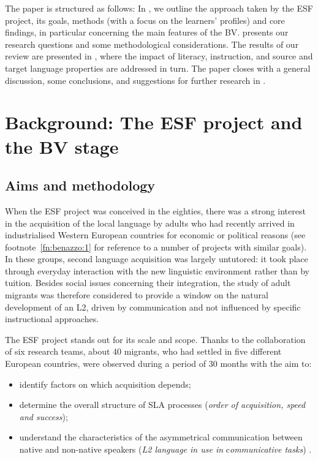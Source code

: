 \documentclass[output=paper]{langscibook}
\begin{document}
The paper is structured as follows: In , we outline the approach taken by the ESF project, its goals, methods (with a focus on the learners’ profiles) and core findings, in particular concerning the main features of the BV.  presents our research questions and some methodological considerations. The results of our review are presented in , where the impact of literacy, instruction, and source and target language properties are addressed in turn. The paper closes with a general discussion, some conclusions, and suggestions for further research in .

\section{Background: The ESF project and the BV stage}\label{sec:benazzo:2}

\subsection{Aims and methodology}\label{sec:benazzo:2.1}

When the ESF project \citep{Perdue1993vol1} was conceived in the eighties, there was a strong interest in the acquisition of the local language by adults who had recently arrived in industrialised Western European countries for economic or political reasons (see footnote~\ref{fn:benazzo:1} for reference to a number of projects with similar goals). In these groups, second language acquisition was largely untutored: it took place through everyday interaction with the new linguistic environment rather than by tuition. Besides social issues concerning their integration, the study of adult migrants was therefore considered to provide a window on the natural development of an L2, driven by communication and not influenced by specific instructional approaches.

The ESF project stands out for its scale and scope. Thanks to the collaboration of six research teams, about 40 migrants, who had settled in five different European countries, were observed during a period of 30 months with the aim to: 

\begin{itemize}\sloppy
\item identify factors on which acquisition depends;
\item determine the overall structure of SLA processes (\textit{order of acquisition, speed and success});
\item understand the characteristics of the asymmetrical communication between native and non-native speakers (\textit{L2 language in use in} c\textit{ommunicative tasks}) \citep{Perdue1993vol1}.
\end{itemize}
\end{document}
